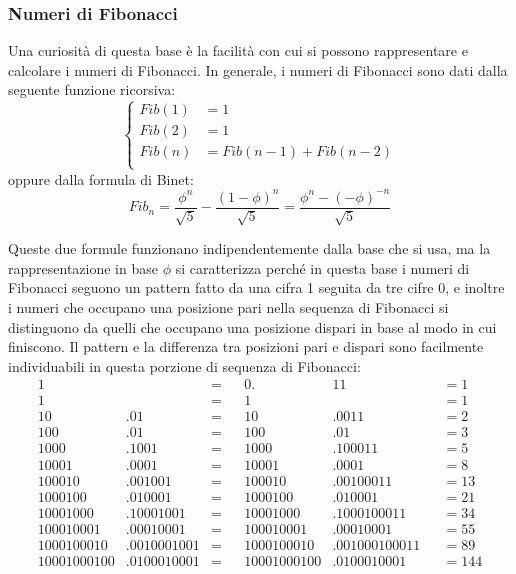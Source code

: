 \documentclass[Lau,oneside]{sapthesis}
\begin{document}
\subsubsection{Numeri di Fibonacci}
Una curiosità di questa base è la facilità con cui si possono rappresentare e calcolare i numeri di Fibonacci. In generale, i numeri di Fibonacci sono dati dalla seguente funzione ricorsiva:
\begin{equation*}
\left\{
\begin{aligned}
Fib(1) & = 1\\
Fib(2) & = 1\\
Fib(n) & = Fib(n-1) + Fib(n-2)\\
\end{aligned}
\right.
\end{equation*}
oppure dalla formula di Binet:
$$Fib_n = \frac{\phi^n}{\sqrt{5}} - \frac{\left(1 - \phi\right)^n}{\sqrt{5}} = \frac{\phi^n - (-\phi)^{-n}}{\sqrt{5}}$$

Queste due formule funzionano indipendentemente dalla base che si usa, ma la rappresentazione in base $\phi$ si caratterizza perché in questa base i numeri di Fibonacci seguono un pattern fatto da una cifra 1 seguita da tre cifre 0, e inoltre i numeri che occupano una posizione pari nella sequenza di Fibonacci si distinguono da quelli che occupano una posizione dispari in base al modo in cui finiscono. Il pattern e la differenza tra posizioni pari e dispari sono facilmente individuabili in questa porzione di sequenza di Fibonacci:
\begin{align*}
1& & = & & 0.&11 & & = 1 \tag{1}\\
1& & = & & 1& & & = 1 \tag{2}\\
10&.01 & = & & 10&.0011 & & = 2 \tag{3}\\
100&.01 & = & & 100&.01 & & = 3 \tag{4}\\
1000&.1001 & = & & 1000&.100011 & & = 5 \tag{5}\\
10001&.0001 & = & & 10001&.0001 & & = 8 \tag{6}\\
100010&.001001 & = & & 100010&.00100011 & & = 13 \tag{7}\\
1000100&.010001 & = & & 1000100&.010001 & & = 21 \tag{8}\\
10001000&.10001001 & = & & 10001000&.1000100011 & & = 34 \tag{9}\\
100010001&.00010001 & = & & 100010001&.00010001 & & = 55 \tag{10}\\
1000100010&.0010001001 & = & & 1000100010&.001000100011 & & = 89 \tag{11}\\
10001000100&.0100010001 & = & & 10001000100&.0100010001 & & = 144 \tag{12}
\end{align*}
\end{document}
